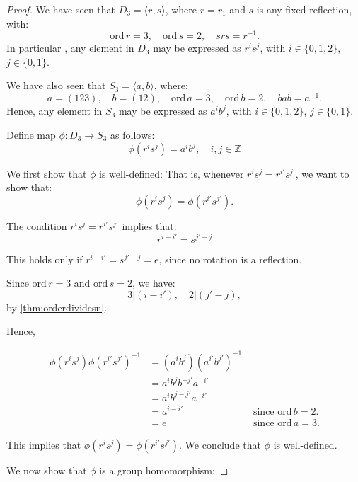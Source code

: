 \documentclass[a4paper,12pt]{report}
\newcommand{\ord}{\mathrm{ord}\,}
\newcommand{\class}[2]{#2}
\renewcommand{\ord}{\mathrm{ord}\,}
\numberwithin{statement}{chapter}
\numberwithin{equation}{chapter}
\numberwithin{section}{chapter}
\numberwithin{subsection}{section}
\begin{document}
\begin{proof}

We have seen that $D_3 = \langle r, s\rangle$, where $r = r_1$ and
$s$ is any fixed reflection,
with:
\[
\ord r = 3,\quad \ord s = 2,\quad srs = r^{-1}.
\]
In particular , any element in $D_3$ may be expressed as $r^is^j$,
with $i \in \{0, 1, 2\}$, $j \in \{0, 1\}$.




We have also seen that $S_3 = \langle a, b \rangle$,
where:
\[
a = (123),\quad b = (12),\quad \ord a = 3,\quad \ord b = 2, \quad bab = a^{-1}.
\]
Hence, any element in $S_3$ may be expressed as $a^ib^j$,
with $i \in \{0, 1, 2\}$, $j \in \{0, 1\}$.




Define map $\phi: D_3 \longrightarrow S_3$ as follows:
\[
\phi(r^is^j) = a^ib^j, \quad i, j \in \mathbb{Z}
\]




We first show that $\phi$ is well-defined:
That is, whenever $r^i s^j = r^{i'}s^{j'}$,
we want to show that:
\[
\phi(r^i s^j) = \phi(r^{i'}s^{j'}).
\]

The condition $r^i s^j = r^{i'}s^{j'}$ implies that:
\[
r^{i - i'} = s^{j' - j}
\]

This holds only if  $r^{i - i'} = s^{j' - j} = e$,
since no rotation is a reflection.




Since $\ord r = 3$ and $\ord s = 2$, we have:
\[
3 | (i - i'), \quad 2 | (j' - j),
\]
by \cref{thm:orderdividesn}.




Hence,

\begin{align*}
\phi(r^is^j) \phi(r^{i'}s^{j'})^{-1}
&= (a^ib^j)(a^{i'}b^{j'})^{-1}
&
\\
&
\class{steps4 steps}{= a^i b^jb^{-j'} a^{-i'}}
&
\\
&
\class{steps4 steps}{= a^i b^{j - j'} a^{-i'}}
&
\\
&
\class{steps4 steps}{= a^{i - i'}}
&
\class{steps4 steps}{\text{ since } \ord b = 2.}
\\
&
\class{steps4 steps}{ = e}
&
\class{steps4 steps}{\text{ since } \ord a = 3.}
\end{align*}

This implies that
$\phi(r^is^j) = \phi(r^{i'}s^{j'})$.
We conclude that $\phi$ is well-defined.




We now show that $\phi$ is a group homomorphism:





\end{proof}
\end{document}
